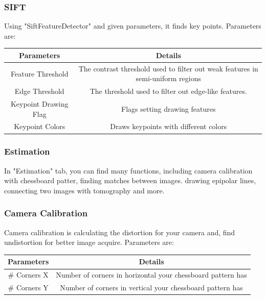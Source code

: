 \documentclass{article}
\begin{document}
	
	\subsubsection{SIFT}
	Using "SiftFeatureDetector" and given parameters, it finds key points. Parameters are:
	
\begin{table}[H]
\begin{center}
\begin{tabular}{|c|c|l|l|l|}
\hline
\textbf{Parameters}   & \multicolumn{4}{|c|}{\textbf{Details}}                                                                \\ \hline
Feature Threshold     & \multicolumn{4}{|c|}{The contrast threshold used to filter out weak features in semi-uniform regions} \\ \hline
Edge Threshold        & \multicolumn{4}{|c|}{The threshold used to filter out edge-like features.}                            \\ \hline
Keypoint Drawing Flag & \multicolumn{4}{|c|}{Flags setting drawing features}                                                  \\ \hline
Keypoint Colors       & \multicolumn{4}{|c|}{Draws keypoints with different colors}                                           \\ \hline
\end{tabular}
\end{center}
\end{table}

\subsubsection{Estimation}
In "Estimation" tab, you can find many functions, including camera calibration with chessboard patter, finding matches between images. drawing epipolar lines, connecting two images with tomography and more.

\subsubsection{Camera Calibration}
Camera calibration is calculating the distortion for your camera and, find undistortion for better image acquire. Parameters are:

\begin{table}[H]
\begin{center}
\begin{tabular}{|c|c|l|l|l|}
\hline
\textbf{Parameters} & \multicolumn{4}{|c|}{\textbf{Details}}                                            \\ \hline
\# Corners X        & \multicolumn{4}{|c|}{Number of corners in horizontal your chessboard pattern has} \\ \hline
\# Corners Y        & \multicolumn{4}{|c|}{Number of corners in vertical your chessboard pattern has}   \\ \hline
\end{tabular}
\end{center}
\end{table}
\end{document}
